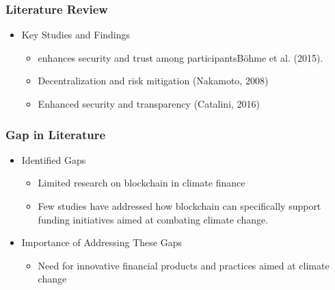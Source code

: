 \documentclass{beamer}
\begin{document}
\begin{frame}
    \frametitle{Literature Review}
    \begin{itemize}
        \item Key Studies and Findings
        \begin{itemize}
        \item enhances security and trust among participantsBöhme et al. (2015).
            \item Decentralization and risk mitigation (Nakamoto, 2008)
            \item Enhanced security and transparency (Catalini, 2016)
        \end{itemize}
    \end{itemize}
\end{frame}

\begin{frame}
    \frametitle{Gap in Literature}
    \begin{itemize}
        \item Identified Gaps
        \begin{itemize}
            \item Limited research on blockchain in climate finance
            \item Few studies have addressed how blockchain can specifically support funding initiatives aimed at combating climate change.
        \end{itemize}
        \item Importance of Addressing These Gaps
        \begin{itemize}
            \item Need for innovative financial products and practices aimed at climate change
        \end{itemize}
    \end{itemize}
\end{frame}
\end{document}
